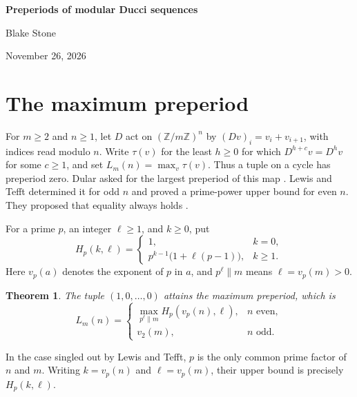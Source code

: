\documentclass[11pt,letterpaper]{article}
\newtheorem{theorem}{Theorem}
\newcommand{\Z}{\mathbb Z}
\begin{document}
\begin{center}
{\LARGE\bfseries Preperiods of modular Ducci sequences\par}
\vspace{9pt}
{\large Blake Stone\par}
\vspace{3pt}
{\small November 26, 2026\par}
\end{center}
\begin{abstract}
The modular Ducci map adds adjacent coordinates of a cyclic tuple. We prove
that the upper bound of Lewis and Tefft for its maximum preperiod is attained.
The lower bound follows from the nilpotency index of the augmentation ideal
of a cyclic group ring. We also give an elementary recursion that counts the
tuples of each preperiod for arbitrary width and modulus. It follows that the
distribution within the basin of any cycle depends only on the cycle length.
\end{abstract}

\section{The maximum preperiod}
For $m\ge2$ and $n\ge1$, let $D$ act on $(\Z/m\Z)^n$ by
$(Dv)_i=v_i+v_{i+1}$, with indices read modulo $n$. Write $\tau(v)$ for
the least $h\ge0$ for which $D^{h+c}v=D^hv$ for some $c\ge1$, and set
$L_m(n)=\max_v\tau(v)$. Thus a tuple on a cycle has preperiod zero.
Dular asked for the largest preperiod of this map \cite[\S7]{dular}.
Lewis and Tefft determined it for odd $n$ \cite{odd} and proved a
prime-power upper bound for even $n$. They proposed that equality always
holds \cite[Theorem 1(3) and the paragraph following it]{even}.

For a prime $p$, an integer $\ell\ge1$, and $k\ge0$, put
\begin{equation}\label{H}
 H_p(k,\ell)=
 \begin{cases}
  1,& k=0,\\
  p^{k-1}\bigl(1+\ell(p-1)\bigr),&k\ge1.
 \end{cases}
\end{equation}
Here $v_p(a)$ denotes the exponent of $p$ in $a$, and $p^\ell\parallel m$
means $\ell=v_p(m)>0$.
\begin{theorem}\label{max}
The tuple $(1,0,\dots,0)$ attains the maximum preperiod, which is
\[
 L_m(n)=\begin{cases}
 \displaystyle\max_{p^\ell\parallel m}H_p(v_p(n),\ell),& n\text{ even},\\
 v_2(m),& n\text{ odd}.
 \end{cases}
\]
\end{theorem}
In the case singled out by Lewis and Tefft, $p$ is the only common prime
factor of $n$ and $m$. Writing $k=v_p(n)$ and $\ell=v_p(m)$, their upper
bound is precisely $H_p(k,\ell)$.
\end{document}

